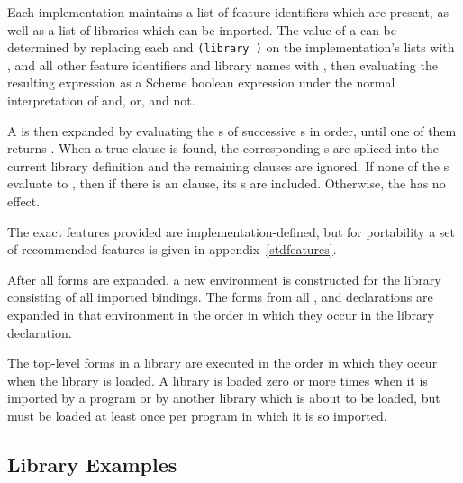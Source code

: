 Each implementation maintains a list of feature identifiers which are
present, as well as a list of libraries which can be imported.  The
value of a  can be determined by replacing
each  and {\tt(library )}
on the implementation's lists with \schtrue, and all other feature
identifiers and library names with \schfalse, then evaluating the
resulting expression as a Scheme boolean expression under the normal
interpretation of {\cf and}, {\cf or}, and {\cf not}.

A  is then expanded by evaluating the
s of successive s
in order, until one of them returns \schtrue.  When a true clause is
found, the corresponding s are spliced into
the current library definition and the remaining clauses are ignored.
If none of the s evaluate to \schtrue, then
if there is an  clause, its s are
included.  Otherwise, the  has no effect.

The exact features provided are implementation-defined, but for
portability a set of recommended features is given in
appendix~\ref{stdfeatures}.


After all  forms are expanded, a new environment is
constructed for the library consisting of all imported bindings.  The
forms from all ,  and 
declarations are expanded in that environment in the order in which
they occur in the library declaration.

The top-level forms in a library are executed in the order in which
they occur when the library is loaded.  A library is loaded zero or more
times when it is imported by a program or by another library which is
about to be loaded, but must be loaded at least once per program in
which it is so imported.


\subsection{Library Examples}

